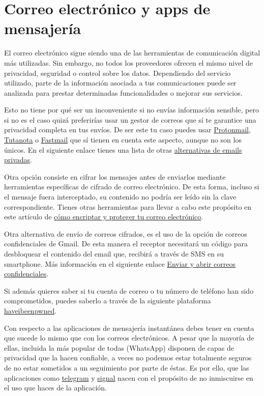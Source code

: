 \documentclass[
  spanish,
  a4paper,
  openany]{book}
\begin{document}
\section{Correo electrónico y apps de mensajería}\label{correo-electruxf3nico-y-apps-de-mensajeruxeda}

El correo electrónico sigue siendo una de las herramientas de comunicación digital más utilizadas. Sin embargo, no todos los proveedores ofrecen el mismo nivel de privacidad, seguridad o control sobre los datos. Dependiendo del servicio utilizado, parte de la información asociada a tus comunicaciones puede ser analizada para prestar determinadas funcionalidades o mejorar sus servicios.

Esto no tiene por qué ser un inconveniente si no envías información sensible, pero si no es el caso quizá preferirías usar un gestor de correos que sí te garantice una privacidad completa en tus envíos. De ser este tu caso puedes usar \href{https://protonmail.com/}{Protonmail}, \href{https://tutanota.com/es/}{Tutanota} o \href{https://www.fastmail.com}{Fastmail} que sí tienen en cuenta este aspecto, aunque no son los únicos. En el siguiente enlace tienes una lista de otras \href{https://blogthinkbig.com/alternativas-gratuitas-gmail-outlook-privacidad}{alternativas de emails privadas}.

Otra opción consiste en cifrar los mensajes antes de enviarlos mediante herramientas específicas de cifrado de correo electrónico. De esta forma, incluso si el mensaje fuera interceptado, su contenido no podría ser leído sin la clave correspondiente. Tienes otras herramientas para llevar a cabo este propósito en este artículo de \href{https://www.osi.es/es/actualidad/blog/2019/07/31/como-encriptar-y-proteger-tu-correo-electronico}{cómo encriptar y proteger tu correo electrónico}.

Otra alternativa de envío de correos cifrados, es el uso de la opción de correos confidenciales de Gmail. De esta manera el receptor necesitará un código para desbloquear el contenido del email que, recibirá a través de SMS en su smartphone. Más información en el siguiente enlace \href{https://support.google.com/mail/answer/7674059?hl=es&co=GENIE.Platform\%3DDesktop}{Enviar y abrir correos confidenciales}.

Si además quieres saber si tu cuenta de correo o tu número de teléfono han sido comprometidos, puedes saberlo a través de la siguiente plataforma \href{https://haveibeenpwned.com/}{haveibeenpwned}.

Con respecto a las aplicaciones de mensajería instantánea debes tener en cuenta que sucede lo mismo que con los correos electrónicos. A pesar que la mayoría de ellas, incluida la más popular de todas (WhatsApp) disponen de capas de privacidad que la hacen confiable, a veces no podemos estar totalmente seguros de no estar sometidos a un seguimiento por parte de éstas. Es por ello, que las aplicaciones como \href{https://telegram.org/}{telegram} y \href{https://signal.org/es/}{signal} nacen con el propósito de no inmiscuirse en el uso que haces de la aplicación.
\end{document}
